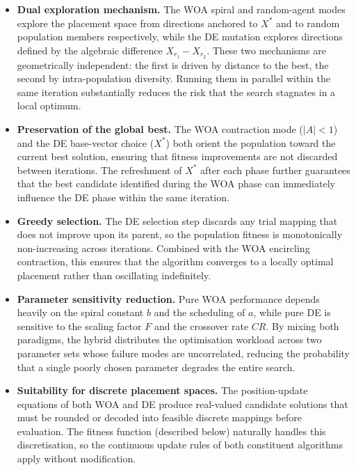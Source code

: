 \documentclass[a4paper, 12pt]{report}
\begin{document}
\begin{itemize}

  \item \textbf{Dual exploration mechanism.}  The WOA spiral and
        random-agent modes explore the placement space from directions
        anchored to $X^*$ and to random population members
        respectively, while the DE mutation explores directions defined
        by the algebraic difference $X_{r_1} - X_{r_2}$.  These two
        mechanisms are geometrically independent: the first is driven
        by distance to the best, the second by intra-population
        diversity.  Running them in parallel within the same iteration
        substantially reduces the risk that the search stagnates in a
        local optimum.

  \item \textbf{Preservation of the global best.}  The WOA contraction
        mode ($|A| < 1$) and the DE base-vector choice ($X^*$) both
        orient the population toward the current best solution, ensuring
        that fitness improvements are not discarded between iterations.
        The refreshment of $X^*$ after each phase further guarantees
        that the best candidate identified during the WOA phase can
        immediately influence the DE phase within the same iteration.

  \item \textbf{Greedy selection.}  The DE selection step discards any
        trial mapping that does not improve upon its parent, so the
        population fitness is monotonically non-increasing across
        iterations.  Combined with the WOA encircling contraction, this
        ensures that the algorithm converges to a locally optimal
        placement rather than oscillating indefinitely.

  \item \textbf{Parameter sensitivity reduction.}  Pure WOA performance
        depends heavily on the spiral constant $b$ and the scheduling of
        $a$, while pure DE is sensitive to the scaling factor $F$ and
        the crossover rate $CR$.  By mixing both paradigms, the hybrid
        distributes the optimisation workload across two parameter sets
        whose failure modes are uncorrelated, reducing the probability
        that a single poorly chosen parameter degrades the entire search.

  \item \textbf{Suitability for discrete placement spaces.}
        The position-update equations of both WOA and DE produce
        real-valued candidate solutions that must be rounded or decoded
        into feasible discrete mappings before evaluation.  The fitness
        function (described below) naturally handles this discretisation,
        so the continuous update rules of both constituent algorithms
        apply without modification.

\end{itemize}
\end{document}
